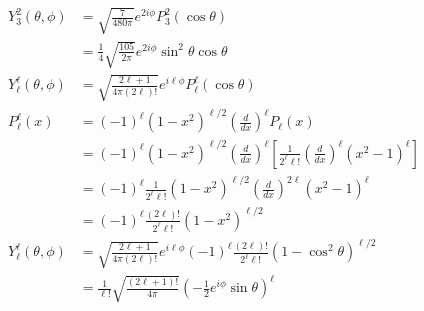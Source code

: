 \documentclass{article}
\begin{document}
\begin{align*}
  Y_3^2(\theta, \phi)       & = \sqrt{\frac{7}{480 \pi}} e^{2 i \phi} P_3^2 (\cos \theta)                                                                                                \\
                            & = \frac{1}{4} \sqrt{\frac{105}{2 \pi}} e^{2 i \phi} \sin^2 \theta \cos \theta                                                                              \\
  Y_\ell^\ell(\theta, \phi) & = \sqrt{\frac{2 \ell + 1}{4 \pi (2 \ell)!}} e^{i \ell \phi} P_\ell^\ell(\cos \theta)                                                                       \\
  P_\ell^\ell(x)            & = (-1)^\ell (1 - x^2)^{\ell / 2} \left( \frac{d}{d x} \right)^\ell P_\ell (x)                                                                              \\
                            & = (-1)^\ell (1 - x^2)^{\ell / 2} \left( \frac{d}{d x} \right)^\ell \left[ \frac{1}{2^\ell \ell!} \left( \frac{d}{d x} \right)^\ell (x^2 - 1)^\ell  \right] \\
                            & = (-1)^\ell \frac{1}{2^\ell \ell!} (1 - x^2)^{\ell / 2} \left( \frac{d}{d x} \right)^{2 \ell} (x^2 - 1)^\ell                                               \\
                            & = (-1)^\ell \frac{(2 \ell)!}{2^\ell \ell!} (1 - x^2)^{\ell / 2}                                                                                            \\
  Y_\ell^\ell(\theta, \phi) & = \sqrt{\frac{2 \ell + 1}{4 \pi (2 \ell)!}} e^{i \ell \phi} (-1)^\ell \frac{(2 \ell)!}{2^\ell \ell!} (1 - \cos^2 \theta)^{\ell / 2}                                  \\
                            & = \frac{1}{\ell!} \sqrt{\frac{(2 \ell + 1)!}{4 \pi}} \left( -\frac{1}{2} e^{i \phi} \sin \theta \right)^\ell
\end{align*}
\end{document}
